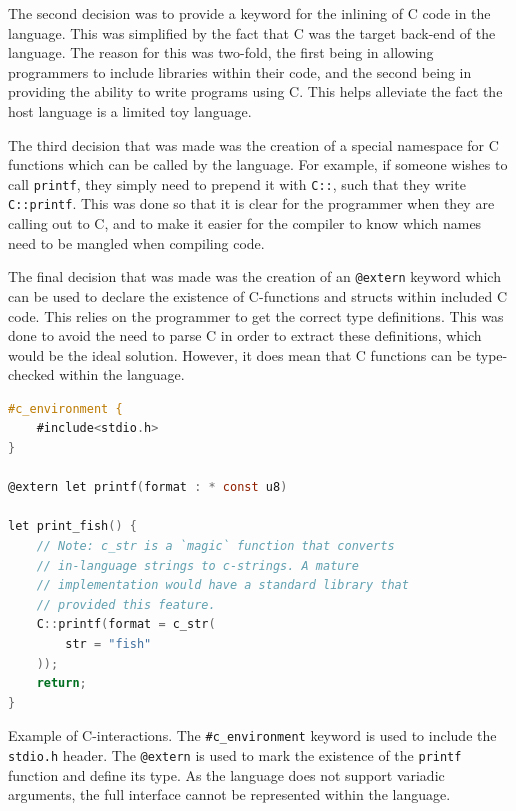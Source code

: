 \documentclass[a4paper,12pt,twoside,openright]{report}
\begin{document}
The second decision was to provide a keyword for the inlining of C code in the
language. This was simplified by the fact that C was the target back-end of the
language. The reason for this was two-fold, the first being in allowing
programmers to include libraries within their code, and the second being in
providing the ability to write programs using C. This helps alleviate the fact
the host language is a limited toy language.

The third decision that was made was the creation of a special namespace for C
functions which can be called by the language. For example, if someone wishes
to call \texttt{printf}, they simply need to prepend it with \texttt{C::}, such
that they write \texttt{C::printf}. This was done so that it is clear for the
programmer when they are calling out to C, and to make it easier for the
compiler to know which names need to be mangled when compiling code.

The final decision that was made was the creation of an \texttt{@extern}
keyword which can be used to declare the existence of C-functions and structs
within included C code. This relies on the programmer to get the correct type
definitions. This was done to avoid the need to parse C in order to extract
these definitions, which would be the ideal solution. However, it does mean
that C functions can be type-checked within the language.


\begin{lstfloat}
\begin{lstlisting}[language=C]
#c_environment {
    #include<stdio.h>
}

@extern let printf(format : * const u8)

let print_fish() {
    // Note: c_str is a `magic` function that converts
    // in-language strings to c-strings. A mature
    // implementation would have a standard library that
    // provided this feature.
    C::printf(format = c_str(
        str = "fish"
    ));
    return;
}
\end{lstlisting}
\label{lst:lang_c_interop}

\caption{Example of C-interactions. The \texttt{\#c\_environment} keyword is
used to include the \texttt{stdio.h} header. The \texttt{@extern} is used to
mark the existence of the \texttt{printf} function and define its type. As the
language does not support variadic arguments, the full interface cannot be
represented within the language.}

\end{lstfloat}
\end{document}
